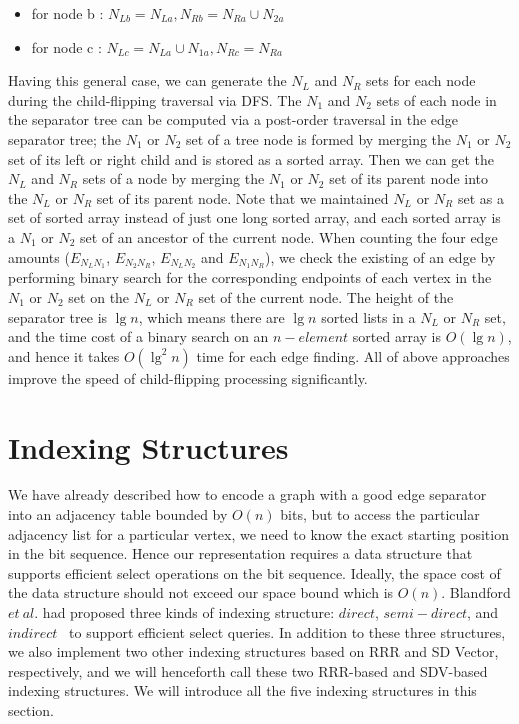 \documentclass[12pt,glossary]{dalthesis}
\begin{document}
\begin{itemize}[noitemsep]
\item for node b : $ N_{Lb} = N_{La}, N_{Rb} = N_{Ra} \cup N_{2a}$
\item for node c : $ N_{Lc} = N_{La} \cup N_{1a}, N_{Rc} = N_{Ra}$ 
\end{itemize}

Having this general case,  we can generate the $N_{L}$ and $N_{R}$ sets for each node during the child-flipping traversal via DFS. The $N_{1}$ and $N_{2}$ sets of each node in the separator tree can be computed via a post-order traversal in the edge separator tree; the $N_{1}$ or $N_{2}$ set of a tree node is formed by merging the $N_{1}$ or $N_{2}$ set of its left or right child and is stored as a sorted array. Then we can get the $N_{L}$ and $N_{R}$ sets of a node by merging the $N_{1}$ or $N_{2}$ set of its parent node into the $N_{L}$ or $N_{R}$ set of its parent node. Note that we maintained $N_{L}$ or $N_{R}$ set as a set of sorted array instead of just one long sorted array, and each sorted array is a $N_{1}$ or $N_{2}$ set of an ancestor of the current node. When counting the four edge amounts ($E_{N_{L}N_{1}}$, $E_{N_{2}N_{R}}$, $E_{N_{L}N_{2}}$ and $E_{N_{1}N_{R}}$), we check the existing of an edge by performing binary search for the corresponding endpoints of each vertex in the $N_{1}$ or $N_{2}$ set on the $N_{L}$ or $N_{R}$ set of the current node. The height of the separator tree is $\lg n$, which means there are $\lg n$ sorted lists in a $N_{L}$ or $N_{R}$ set, and the time cost of a binary search on an $n-element$ sorted array is $O(\lg n)$, and hence it takes $O(\lg ^{2} n)$ time for each edge finding. All of above approaches improve the speed of child-flipping processing significantly.

\section{Indexing Structures}

We have already described how to encode a graph with a good edge separator into an adjacency table bounded by $O(n)$ bits, but to access the particular adjacency list for a particular vertex, we need to know the exact starting position in the bit sequence. Hence our representation requires a data structure that supports efficient select operations on the bit sequence. Ideally, the space cost of the data structure should not exceed our space bound which is $O(n)$. Blandford $et \ al.$ had proposed three kinds of indexing structure: $direct$, $semi-direct$, and $indirect$~\cite{compact-representation} to support efficient select queries. In addition to these three structures, we also implement two other indexing structures based on RRR and SD Vector, respectively, and we will henceforth call these two RRR-based and SDV-based indexing structures. We will introduce all the five indexing structures in this section.
\end{document}
